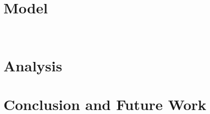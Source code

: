 \documentclass{article}
\begin{document}

\section{Model}
~\cite{redner2001guide}



\section{Analysis}

\section{Conclusion and Future Work}
\end{document}
